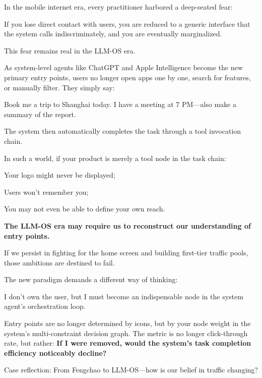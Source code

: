 In the mobile internet era, every practitioner harbored a deep-seated fear:

If you lose direct contact with users, you are reduced to a generic interface that the system calls indiscriminately, and you are eventually marginalized.

\vspace{1em}

This fear remains real in the LLM-OS era.

As system-level agents like ChatGPT and Apple Intelligence become the new primary entry points, users no longer open apps one by one, search for features, or manually filter. They simply say:

{\kaiti
Book me a trip to Shanghai today. I have a meeting at 7 PM---also make a summary of the report.
}

The system then automatically completes the task through a tool invocation chain.

In such a world, if your product is merely a tool node in the task chain:

{\kaiti
Your logo might never be displayed;

Users won't remember you;

You may not even be able to define your own reach.
}

\vspace{1em}

\newpage
\textbf{The LLM-OS era may require us to reconstruct our understanding of entry points.}

If we persist in fighting for the home screen and building first-tier traffic pools, those ambitions are destined to fail.

The new paradigm demands a different way of thinking:

\begin{myquote}I don't own the user, but I must become an indispensable node in the system agent's orchestration loop.
\end{myquote}

Entry points are no longer determined by icons, but by your node weight in the system's multi-constraint decision graph. The metric is no longer click-through rate, but rather:
\textbf{If I were removed, would the system's task completion efficiency noticeably decline?}

\vspace{1em}

Case reflection: From Fengchao to LLM-OS---how is our belief in traffic changing?

